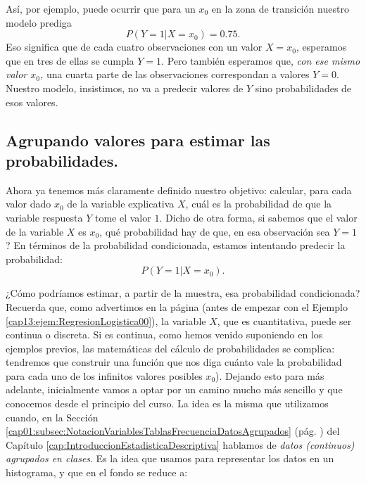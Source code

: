 Así, por ejemplo, puede ocurrir que para un $x_0$ en la zona de transición nuestro modelo prediga
\[P(Y = 1 | X= x_0) = 0.75.\]
Eso significa que de cada cuatro observaciones con un valor $X=x_0$, esperamos que en tres de ellas se cumpla $Y=1$. Pero también esperamos que, \emph{con ese mismo valor $x_0$,} una cuarta parte de las observaciones correspondan a valores $Y=0$. Nuestro modelo, insistimos, no va a predecir valores de $Y$ sino probabilidades de esos valores.

\subsection{Agrupando valores para estimar las probabilidades.}
\label{cap13:subsec:AgrupandoValoresEstimarProbabilidades}

Ahora ya tenemos más claramente definido nuestro objetivo: calcular, para cada valor dado $x_0$ de la variable explicativa $X$, cuál es la probabilidad de que la variable respuesta $Y$ tome el valor $1$. Dicho de otra forma, si sabemos que el valor de la variable $X$ es $x_0$, \textquestiondown qué probabilidad hay de que, en esa observación sea $Y=1$? En términos de la probabilidad condicionada, estamos intentando predecir la probabilidad:
	\begin{equation}
    \label{cap13:ecu:ProbLogistica}
    P(Y=1|X=x_0).
	\end{equation}

¿Cómo podríamos estimar, a partir de la muestra, esa probabilidad condicionada? Recuerda que,
como advertimos en la página \pageref{cap13:ejem:RegresionLogistica00} (antes de empezar con el
Ejemplo \ref{cap13:ejem:RegresionLogistica00}), la variable $X$, que es cuantitativa, puede ser
continua o discreta. Si es continua, como hemos venido suponiendo en los ejemplos previos, las matemáticas del cálculo de probabilidades se complica: tendremos que construir una función que nos diga cuánto vale la probabilidad para cada uno de los infinitos valores posibles $x_0$). Dejando esto para más adelante, inicialmente vamos a optar por un
camino mucho más sencillo y que conocemos desde el principio del curso. La idea es la misma que
utilizamos cuando, en la Sección \ref{cap01:subsec:NotacionVariablesTablasFrecuenciaDatosAgrupados}
(pág. \pageref{cap01:subsec:NotacionVariablesTablasFrecuenciaDatosAgrupados}) del Capítulo
\ref{cap:IntroduccionEstadisticaDescriptiva} hablamos de {\em datos (continuos) agrupados en
clases}. Es la idea que usamos para representar los datos en un histograma, y que en el fondo se
reduce a:

